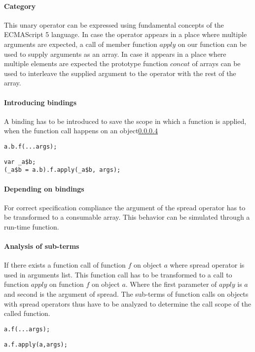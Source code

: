 \documentclass[10pt,a4paper]{article}
\begin{document}
\paragraph{Category}
This unary operator can be expressed using fundamental concepts of the ECMAScript 5 language. In case the operator appears in a place where multiple arguments are expected, a call of member function $apply$ on our function can be used to supply arguments as an array. In case it appears in a place where multiple elements are expected the prototype function $concat$ of arrays can be used to interleave the supplied argument to the operator with the rest of the array. 

\paragraph{Introducing bindings}
A binding has to be introduced to save the scope in which a function is applied, when the function call happens on an object\ref{spread-analysis-sub-terms}

\begin{lstlisting}
a.b.f(...args);
\end{lstlisting}
\begin{lstlisting}
var _a$b;
(_a$b = a.b).f.apply(_a$b, args);
\end{lstlisting}

\paragraph{Depending on bindings}
For correct specification compliance the argument of the spread operator has to be transformed to a consumable array. This behavior can be simulated through a run-time function.

\paragraph{Analysis of sub-terms} \label{spread-analysis-sub-terms}
If there exists a function call of function $f$ on object $a$ where spread operator is used in arguments list. This function call has to be transformed to a call to function $apply$ on function $f$ on object $a$. Where the first parameter of $apply$ is $a$ and second is the argument of spread. The sub-terms of function calls on objects with spread operators thus have to be analyzed to determine the call scope of the called function.

\begin{lstlisting}
a.f(...args);
\end{lstlisting}
\begin{lstlisting}[caption={apply function with correct $this$ scope}]
a.f.apply(a,args);
\end{lstlisting}
\end{document}
